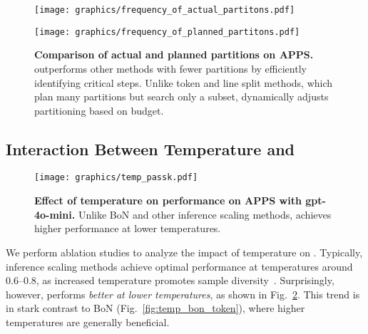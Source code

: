\begin{figure}[t]
    \centering
    \begin{minipage}{0.49\linewidth}
        \centering
        \texttt{[image: graphics/frequency\_of\_actual\_partitons.pdf]}
        \label{fig:actual_part_freq}
    \end{minipage}
    \hfill
    \begin{minipage}{0.49\linewidth}
        \centering
        \texttt{[image: graphics/frequency\_of\_planned\_partitons.pdf]}
        \label{fig:planned_part_freq}
    \end{minipage}
 \vspace{-0.7cm}
    \caption{\textbf{Comparison of actual and planned partitions on APPS.}  
    \decomp outperforms other methods with fewer partitions by efficiently identifying critical steps. Unlike token and line split methods, which plan many partitions but search only a subset, \decomp dynamically adjusts partitioning based on budget.}
    \vspace{-0.3cm}
    \label{fig:partition_comparison}
\end{figure}

\subsection{Interaction Between Temperature and \decomp}

\begin{figure}[ht]
    \centering
    \vspace{-0.1cm}
    \texttt{[image: graphics/temp\_passk.pdf]}
    \vspace{-0.3cm}
    \caption{\textbf{Effect of temperature on \decomp performance on APPS with gpt-4o-mini.} Unlike BoN and other inference scaling methods, \decomp achieves higher performance at lower temperatures.}
    \label{fig:disc_temp_passk}\vspace{-0.5cm}
\end{figure}

We perform ablation studies to analyze the impact of temperature on \decomp. 
Typically, inference scaling methods achieve optimal performance at temperatures around 0.6–0.8, as increased temperature promotes sample diversity~\citep{wang2024planning}. 
Surprisingly, however, \decomp performs \emph{better at lower temperatures}, as shown in Fig.~\ref{fig:disc_temp_passk}. This trend is in stark contrast to BoN (Fig.~\ref{fig:temp_bon_token}), where higher temperatures are generally beneficial.

